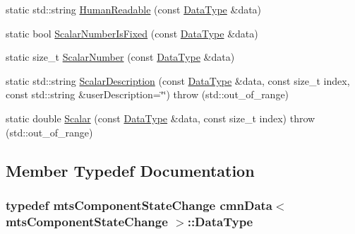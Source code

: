 \begin{DoxyCompactItemize}
\item 
static std\+::string \hyperlink{classcmn_data_3_01mts_component_state_change_01_4_a427832b3b27491d21f2a0c1e83bf0bee}{Human\+Readable} (const \hyperlink{classcmn_data_3_01mts_component_state_change_01_4_ac0a63a5c1053b74da61e82e08c0a5d7b}{Data\+Type} \&data)
\item 
static bool \hyperlink{classcmn_data_3_01mts_component_state_change_01_4_a18562cdb4417a033af5bac6ae2da2a6d}{Scalar\+Number\+Is\+Fixed} (const \hyperlink{classcmn_data_3_01mts_component_state_change_01_4_ac0a63a5c1053b74da61e82e08c0a5d7b}{Data\+Type} \&data)
\item 
static size\+\_\+t \hyperlink{classcmn_data_3_01mts_component_state_change_01_4_a5a9efbd6dcab3bc9a4e87d17d5d6b693}{Scalar\+Number} (const \hyperlink{classcmn_data_3_01mts_component_state_change_01_4_ac0a63a5c1053b74da61e82e08c0a5d7b}{Data\+Type} \&data)
\item 
static std\+::string \hyperlink{classcmn_data_3_01mts_component_state_change_01_4_a37782e789da0b143aed01fca25ee3a99}{Scalar\+Description} (const \hyperlink{classcmn_data_3_01mts_component_state_change_01_4_ac0a63a5c1053b74da61e82e08c0a5d7b}{Data\+Type} \&data, const size\+\_\+t index, const std\+::string \&user\+Description=\char`\"{}\char`\"{})  throw (std\+::out\+\_\+of\+\_\+range)
\item 
static double \hyperlink{classcmn_data_3_01mts_component_state_change_01_4_a37d589f934cc2457f3669fd1ff015208}{Scalar} (const \hyperlink{classcmn_data_3_01mts_component_state_change_01_4_ac0a63a5c1053b74da61e82e08c0a5d7b}{Data\+Type} \&data, const size\+\_\+t index)  throw (std\+::out\+\_\+of\+\_\+range)
\end{DoxyCompactItemize}


\subsection{Member Typedef Documentation}
\hypertarget{classcmn_data_3_01mts_component_state_change_01_4_ac0a63a5c1053b74da61e82e08c0a5d7b}{}
\subsubsection[{Data\+Type}]{\setlength{\rightskip}{0pt plus 5cm}typedef {\bf mts\+Component\+State\+Change} {\bf cmn\+Data}$<$ {\bf mts\+Component\+State\+Change} $>$\+::{\bf Data\+Type}}\label{classcmn_data_3_01mts_component_state_change_01_4_ac0a63a5c1053b74da61e82e08c0a5d7b}


